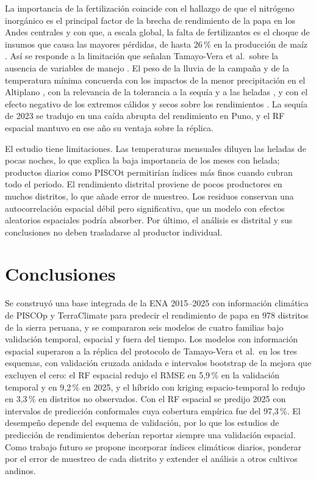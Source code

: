 \documentclass[conference,letterpaper]{IEEEtran}
\begin{document}
La importancia de la fertilización coincide con el hallazgo de que el nitrógeno inorgánico es el principal factor de la brecha de rendimiento de la papa en los Andes centrales \cite{yieldgap2020} y con que, a escala global, la falta de fertilizantes es el choque de insumos que causa las mayores pérdidas, de hasta 26\,\% en la producción de maíz \cite{inputs2023}. Así se responde a la limitación que señalan Tamayo-Vera et al.\ sobre la ausencia de variables de manejo \cite{tamayovera2025}. El peso de la lluvia de la campaña y de la temperatura mínima concuerda con los impactos de la menor precipitación en el Altiplano \cite{aquacrop2024}, con la relevancia de la tolerancia a la sequía \cite{landraces2023} y a las heladas \cite{frost2024}, y con el efecto negativo de los extremos cálidos y secos sobre los rendimientos \cite{extremes2023,plants2025}. La sequía de 2023 se tradujo en una caída abrupta del rendimiento en Puno, y el RF espacial mantuvo en ese año su ventaja sobre la réplica.

El estudio tiene limitaciones. Las temperaturas mensuales diluyen las heladas de pocas noches, lo que explica la baja importancia de los meses con helada; productos diarios como PISCOt \cite{pisco_t2023} permitirían índices más finos cuando cubran todo el periodo. El rendimiento distrital proviene de pocos productores en muchos distritos, lo que añade error de muestreo. Los residuos conservan una autocorrelación espacial débil pero significativa, que un modelo con efectos aleatorios espaciales podría absorber. Por último, el análisis es distrital y sus conclusiones no deben trasladarse al productor individual.

\section{Conclusiones}
Se construyó una base integrada de la ENA 2015--2025 con información climática de PISCOp y TerraClimate para predecir el rendimiento de papa en 978 distritos de la sierra peruana, y se compararon seis modelos de cuatro familias bajo validación temporal, espacial y fuera del tiempo. Los modelos con información espacial superaron a la réplica del protocolo de Tamayo-Vera et al.\ en los tres esquemas, con validación cruzada anidada e intervalos bootstrap de la mejora que excluyen el cero: el RF espacial redujo el RMSE en 5,9\,\% en la validación temporal y en 9,2\,\% en 2025, y el híbrido con kriging espacio-temporal lo redujo en 3,3\,\% en distritos no observados. Con el RF espacial se predijo 2025 con intervalos de predicción conformales cuya cobertura empírica fue del 97,3\,\%. El desempeño depende del esquema de validación, por lo que los estudios de predicción de rendimientos deberían reportar siempre una validación espacial. Como trabajo futuro se propone incorporar índices climáticos diarios, ponderar por el error de muestreo de cada distrito y extender el análisis a otros cultivos andinos.



\end{document}
